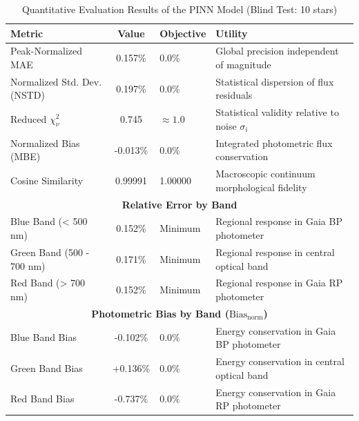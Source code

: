 
\begin{table}[htpb]
\centering
\caption{Quantitative Evaluation Results of the PINN Model (Blind Test: 10 stars)}
\label{tab:pinn_evaluation}
\begin{tabular}{lcll}
\hline
\textbf{Metric} & \textbf{Value} & \textbf{Objective} & \textbf{Utility} \\
\hline
Peak-Normalized MAE & 0.157\% & 0.0\% & Global precision independent of magnitude \\
Normalized Std. Dev. (NSTD) & 0.197\% & 0.0\% & Statistical dispersion of flux residuals \\
Reduced $\chi^2_\nu$ & 0.745 & $\approx 1.0$ & Statistical validity relative to noise $\sigma_i$ \\
Normalized Bias (MBE) & -0.013\% & 0.0\% & Integrated photometric flux conservation \\
Cosine Similarity & 0.99991 & 1.00000 & Macroscopic continuum morphological fidelity \\
\hline
\multicolumn{4}{c}{\textbf{Relative Error by Band}} \\
\hline
Blue Band (< 500 nm) & 0.152\% & Minimum & Regional response in Gaia BP photometer \\
Green Band (500 - 700 nm) & 0.171\% & Minimum & Regional response in central optical band \\
Red Band (> 700 nm) & 0.152\% & Minimum & Regional response in Gaia RP photometer \\
\hline
\multicolumn{4}{c}{\textbf{Photometric Bias by Band ($\text{Bias}_{\text{norm}}$)}} \\
\hline
Blue Band Bias & -0.102\% & 0.0\% & Energy conservation in Gaia BP photometer \\
Green Band Bias & +0.136\% & 0.0\% & Energy conservation in central optical band \\
Red Band Bias & -0.737\% & 0.0\% & Energy conservation in Gaia RP photometer \\
\hline
\end{tabular}
\end{table}
